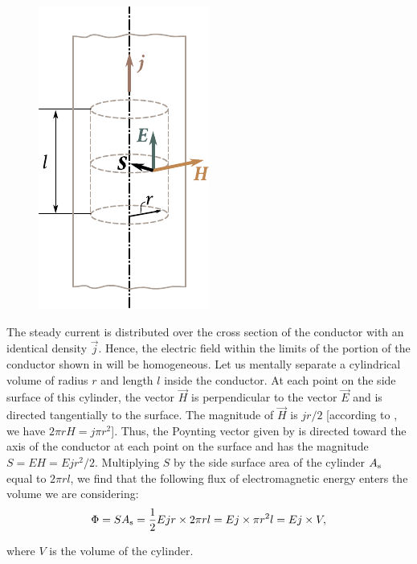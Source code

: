 \begin{figure}[t]
	\begin{center}
		\includegraphics[scale=1]{figures/ch_15/fig_15_3.pdf}
		\caption[]{}
		\label{fig:15_3}
	\end{center}
	\vspace{-0.8cm}
\end{figure}

The steady current is distributed over the cross section of the conductor with an identical density $\vec{j}$.
Hence, the electric field within the limits of the portion of the conductor shown in  will
be homogeneous.
Let us mentally separate a cylindrical volume of radius $r$ and length $l$ inside the conductor.
At each point on the side surface of this cylinder, the vector $\vec{H}$ is perpendicular to the vector $\vec{E}$ and is directed tangentially to the surface.
The magnitude of $\vec{H}$ is $jr/2$ [according to , we have $2\pi rH = j\pi r^2$].
Thus, the Poynting vector given by  is directed toward the axis of the conductor at each point on the surface and has the magnitude $S=EH=Ej r^2/2$.
Multiplying $S$ by the side surface area of the cylinder $A_{\text{s}}$ equal to $2\pi rl$, we find that the following flux of electromagnetic energy enters the volume we are considering:
\begin{equation}\label{eq:15_31}
    \Phi = S A_{\text{s}} = \frac{1}{2} Ejr \times 2\pi rl = Ej \times \pi r^2 l = Ej \times V,
\end{equation}

\noindent
where $V$ is the volume of the cylinder.

